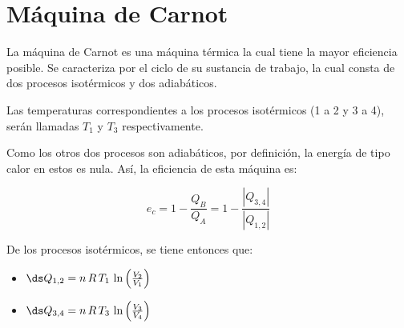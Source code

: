 \section{Máquina de Carnot}

La máquina de Carnot es una máquina térmica la cual tiene la mayor
eficiencia posible. Se caracteriza por el ciclo de su sustancia de
trabajo, la cual consta de dos procesos isotérmicos y dos adiabáticos.

\begin{center}
\end{center}

Las temperaturas correspondientes a los procesos isotérmicos
(1 a 2 y 3 a 4), serán llamadas $T_1$ y $T_3$ respectivamente.

Como los otros dos procesos son adiabáticos, por definición, la energía
de tipo calor en estos es nula. Así, la eficiencia de esta máquina es:

\[e_c = 1 - \frac{Q_B}{Q_A} = 1 - \frac{|Q_{3,4}|}{|Q_{1,2}|}\]

De los procesos isotérmicos, se tiene entonces que:

\begin{itemize}
  \item \(\ds Q_{1,2} = n\,R\,T_1\,\ln\left(\frac{V_2}{V_1}\right)\)
  \item \(\ds Q_{3,4} = n\,R\,T_3\,\ln\left(\frac{V_3}{V_4}\right)\)
\end{itemize}

